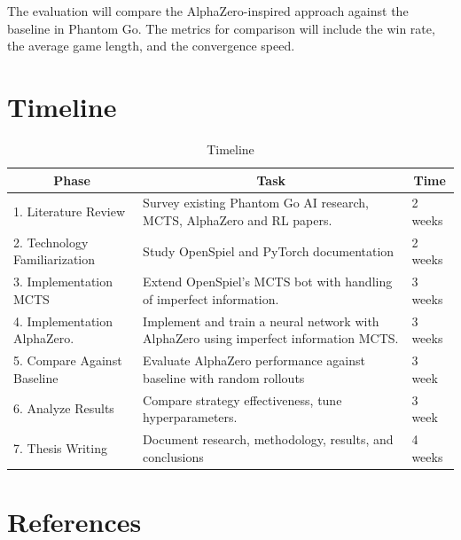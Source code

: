 \documentclass[12pt,oneside,openright]{article}
\begin{document}
The evaluation will compare the AlphaZero-inspired approach against the baseline in Phantom Go. The metrics for comparison will include the win rate, the average game length, and the convergence speed.


\section{Timeline}

\begin{table}[H]
  \caption{Timeline}
  \centering
  \begin{tabularx}{\textwidth}{X|X|l}
    \toprule
    \multicolumn{1}{c}{Phase}     &
    \multicolumn{1}{c}{Task}      &
    \multicolumn{1}{c}{Time}                                                                                                        \\
    \midrule
    1. Literature Review          & Survey existing Phantom Go AI research, MCTS, AlphaZero and RL papers.                & 2 weeks \\
    \hline
    2. Technology Familiarization & Study OpenSpiel and PyTorch documentation                                             & 2 weeks \\
    \hline
    3. Implementation MCTS        & Extend OpenSpiel's MCTS bot with handling of imperfect information.                   & 3 weeks \\
    \hline
    4. Implementation AlphaZero.  & Implement and train a neural network with AlphaZero using imperfect information MCTS. & 3 weeks \\
    \hline
    5. Compare Against Baseline   & Evaluate AlphaZero performance against baseline with random rollouts                  & 3 week  \\
    \hline
    6. Analyze Results            & Compare strategy effectiveness, tune hyperparameters.                                 & 3 week  \\
    \hline
    7. Thesis Writing             & Document research, methodology, results, and conclusions                              & 4 weeks \\
    \hline
  \end{tabularx}
  \label{tab:timeline}
\end{table}


\section{References}
\printbibliography[heading=none]
\end{document}
